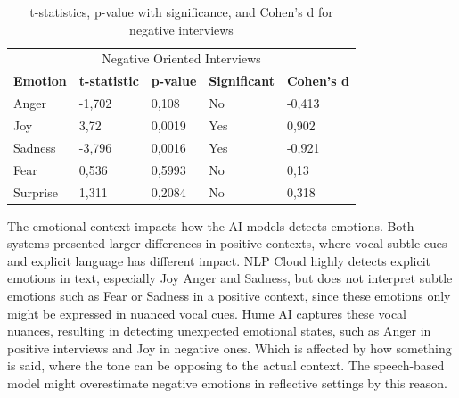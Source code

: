 \begin{table}[!h]
    \centering
    \begin{tabular}{lllll}
    \multicolumn{5}{c}{\cellcolor[HTML]{C0C0C0}Negative Oriented Interviews}                                                                                                                                    \\
    \multicolumn{1}{c|}{\textbf{Emotion}} & \multicolumn{1}{c}{\textbf{t-statistic}} & \multicolumn{1}{c}{\textbf{p-value}} & \multicolumn{1}{c}{\textbf{Significant}} & \multicolumn{1}{c}{\textbf{Cohen's d}} \\ \hline
    \multicolumn{1}{l|}{Anger}            & -1,702                                   & 0,108                                & No                                       & -0,413                                 \\
    \multicolumn{1}{l|}{Joy}              & 3,72                                     & 0,0019                               & Yes                                      & 0,902                                  \\
    \multicolumn{1}{l|}{Sadness}          & -3,796                                   & 0,0016                               & Yes                                      & -0,921                                 \\
    \multicolumn{1}{l|}{Fear}             & 0,536                                    & 0,5993                               & No                                       & 0,13                                   \\
    \multicolumn{1}{l|}{Surprise}         & 1,311                                    & 0,2084                               & No                                       & 0,318                                 
    \end{tabular}
    \caption{t-statistics, p-value with significance, and Cohen's d for negative interviews}
    \label{tab:t-test-neg}
\end{table}

The emotional context impacts how the AI models detects emotions. Both systems presented larger differences in positive contexts, where vocal subtle cues and explicit language 
has different impact. 
NLP Cloud highly detects explicit emotions in text, especially Joy Anger and Sadness, but does not interpret subtle emotions such as Fear or Sadness in a positive context, since these emotions only might be expressed in nuanced vocal cues.
Hume AI captures these vocal nuances, resulting in detecting unexpected emotional states, such as Anger in positive interviews and Joy in negative ones. 
Which is affected by how something is said, where the tone can be opposing to the actual context. The speech-based model 
might overestimate negative emotions in reflective settings by this reason. 

